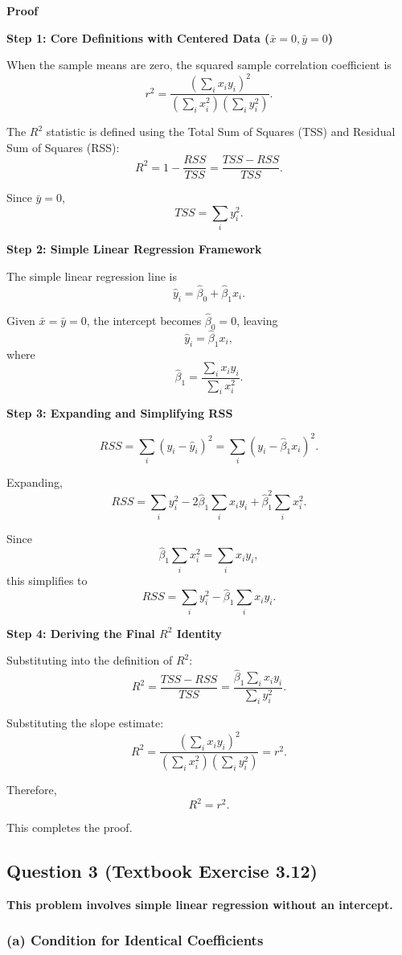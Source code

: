 \documentclass[12pt,a4paper]{article}
\begin{document}
\textbf{Proof}

\textbf{Step 1: Core Definitions with Centered Data ($\bar{x}=0,\bar{y}=0$)}

When the sample means are zero, the squared sample correlation coefficient is
\[
r^2=
\frac{\left(\sum_i x_i y_i\right)^2}
{\left(\sum_i x_i^2\right)\left(\sum_i y_i^2\right)}.
\]

The $R^2$ statistic is defined using the Total Sum of Squares (TSS) and Residual Sum of Squares (RSS):
\[
R^2=1-\frac{RSS}{TSS}=\frac{TSS-RSS}{TSS}.
\]

Since $\bar{y}=0$,
\[
TSS=\sum_i y_i^2.
\]

\textbf{Step 2: Simple Linear Regression Framework}

The simple linear regression line is
\[
\hat{y}_i=\hat{\beta}_0+\hat{\beta}_1x_i.
\]

Given $\bar{x}=\bar{y}=0$, the intercept becomes $\hat{\beta}_0=0$, leaving
\[
\hat{y}_i=\hat{\beta}_1x_i,
\]
where
\[
\hat{\beta}_1=\frac{\sum_i x_i y_i}{\sum_i x_i^2}.
\]

\textbf{Step 3: Expanding and Simplifying RSS}

\[
RSS=\sum_i(y_i-\hat{y}_i)^2
=\sum_i(y_i-\hat{\beta}_1x_i)^2.
\]

Expanding,
\[
RSS=\sum_i y_i^2
-2\hat{\beta}_1\sum_i x_i y_i
+\hat{\beta}_1^2\sum_i x_i^2.
\]

Since
\[
\hat{\beta}_1\sum_i x_i^2=\sum_i x_i y_i,
\]
this simplifies to
\[
RSS=\sum_i y_i^2-\hat{\beta}_1\sum_i x_i y_i.
\]

\textbf{Step 4: Deriving the Final $R^2$ Identity}

Substituting into the definition of $R^2$:
\[
R^2=\frac{TSS-RSS}{TSS}
=\frac{\hat{\beta}_1\sum_i x_i y_i}{\sum_i y_i^2}.
\]

Substituting the slope estimate:
\[
R^2=
\frac{\left(\sum_i x_i y_i\right)^2}
{\left(\sum_i x_i^2\right)\left(\sum_i y_i^2\right)}
=r^2.
\]

Therefore,
\[
\boxed{R^2=r^2}.
\]

This completes the proof.

\subsection*{Question 3 (Textbook Exercise 3.12)}

\textbf{This problem involves simple linear regression without an intercept.}

\subsubsection*{(a) Condition for Identical Coefficients}
\end{document}
